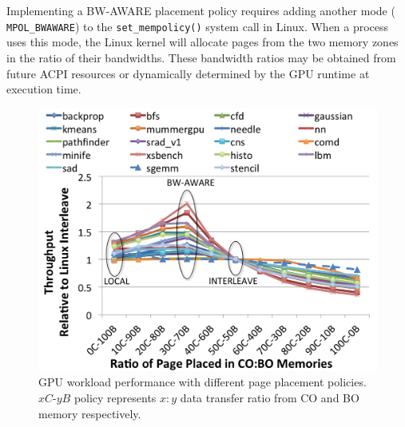 
Implementing a BW-AWARE placement policy requires adding another mode ({\tt
MPOL\_BWAWARE}) to the {\tt set\_mempolicy()} system call in Linux\@. When a
process uses this mode, the Linux kernel will allocate pages from the two memory
zones in the ratio of their bandwidths.  These bandwidth ratios may be obtained
from future ACPI resources or dynamically determined by the GPU runtime at
execution time.

\begin{figure}[t]
    \centering
    \includegraphics[width=0.9\columnwidth]{asplos2015/figures/bw-aware-2.png} 
    \caption{GPU workload performance with different page placement policies.
$xC$-$yB$ policy represents $x:y$ data transfer ratio from CO and BO memory respectively.}
    \label{fig:baseline}
\end{figure}

